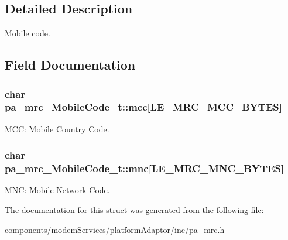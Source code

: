\subsection{Detailed Description}
Mobile code. 

\subsection{Field Documentation}
\subsubsection[{\texorpdfstring{mcc}{mcc}}]{\setlength{\rightskip}{0pt plus 5cm}char pa\+\_\+mrc\+\_\+\+Mobile\+Code\+\_\+t\+::mcc\mbox{[}{\bf L\+E\+\_\+\+M\+R\+C\+\_\+\+M\+C\+C\+\_\+\+B\+Y\+T\+ES}\mbox{]}}\hypertarget{structpa__mrc___mobile_code__t_a3e12dee137209897eaad7bae61499c32}{}\label{structpa__mrc___mobile_code__t_a3e12dee137209897eaad7bae61499c32}


M\+CC\+: Mobile Country Code. 

\subsubsection[{\texorpdfstring{mnc}{mnc}}]{\setlength{\rightskip}{0pt plus 5cm}char pa\+\_\+mrc\+\_\+\+Mobile\+Code\+\_\+t\+::mnc\mbox{[}{\bf L\+E\+\_\+\+M\+R\+C\+\_\+\+M\+N\+C\+\_\+\+B\+Y\+T\+ES}\mbox{]}}\hypertarget{structpa__mrc___mobile_code__t_afa5ce7bc019d46d626ddfa545ac1f316}{}\label{structpa__mrc___mobile_code__t_afa5ce7bc019d46d626ddfa545ac1f316}


M\+NC\+: Mobile Network Code. 



The documentation for this struct was generated from the following file\+:\begin{DoxyCompactItemize}
\item 
components/modem\+Services/platform\+Adaptor/inc/\hyperlink{pa__mrc_8h}{pa\+\_\+mrc.\+h}\end{DoxyCompactItemize}
